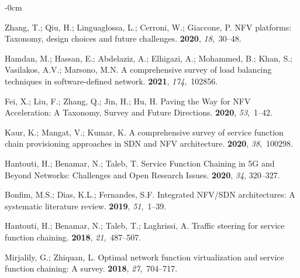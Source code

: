 \documentclass[futureinternet,review,accept,pdftex,moreauthors]{Definitions/mdpi}
\begin{document}
\begin{adjustwidth}{-\extralength}{0cm}
\begin{thebibliography}{999}
Zhang, T.; Qiu, H.; Linguaglossa, L.; Cerroni, W.; Giaccone, P.
\newblock NFV platforms: Taxonomy, design choices and future challenges.
 {\bf 2020},
  {\em 18},~30--48.

Hamdan, M.; Hassan, E.; Abdelaziz, A.; Elhigazi, A.; Mohammed, B.; Khan, S.;
  Vasilakos, A.V.; Marsono, M.N.
\newblock A comprehensive survey of load balancing techniques in
  software-defined network.
 {\bf 2021}, {\em
  174},~102856.

Fei, X.; Liu, F.; Zhang, Q.; Jin, H.; Hu, H.
\newblock Paving the Way for NFV Acceleration: A Taxonomy, Survey and Future
  Directions.
 {\bf 2020}, {\em 53},~1--42.

Kaur, K.; Mangat, V.; Kumar, K.
\newblock A comprehensive survey of service function chain provisioning
  approaches in SDN and NFV architecture.
 {\bf 2020}, {\em 38},~100298.

Hantouti, H.; Benamar, N.; Taleb, T.
\newblock Service Function Chaining in 5G and Beyond Networks: Challenges and
  Open Research Issues.
 {\bf 2020}, \emph{34}, 320--327.

Bonfim, M.S.; Dias, K.L.; Fernandes, S.F.
\newblock Integrated NFV/SDN architectures: A systematic literature review.
 {\bf 2019}, {\em 51},~1--39.

Hantouti, H.; Benamar, N.; Taleb, T.; Laghrissi, A.
\newblock Traffic steering for service function chaining.
 {\bf 2018}, {\em
  21},~487--507.

Mirjalily, G.; Zhiquan, L.
\newblock Optimal network function virtualization and service function
  chaining: A survey.
 {\bf 2018}, {\em 27},~704--717.


\end{thebibliography}
\end{adjustwidth}
\end{document}
